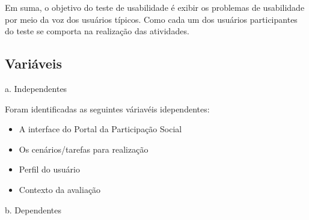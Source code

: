 Em suma, o objetivo do teste de usabilidade é exibir os problemas de usabilidade por meio da voz dos usuários típicos. Como cada um dos usuários participantes do teste se comporta na realização das atividades.


\subsection{Variáveis}
 
a. Independentes

Foram identificadas as seguintes váriavéis idependentes: 

\begin{itemize}
	\item A interface do Portal da Participação Social
	\item Os cenários/tarefas para realização
	\item Perfil do usuário
	\item Contexto da avaliação
\end{itemize}

b. Dependentes


